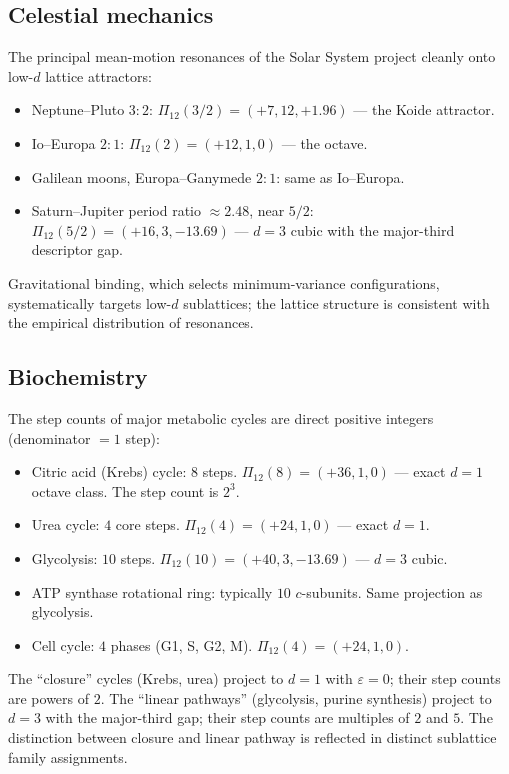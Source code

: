 \documentclass[11pt,a4paper]{article}
\theoremstyle{definition}
\theoremstyle{remark}
\newcommand{\eps}{\varepsilon}
\begin{document}
\subsection{Celestial mechanics}\label{subsec:celestial}

The principal mean-motion resonances of the Solar System project cleanly onto low-$d$ lattice attractors:
\begin{itemize}[leftmargin=*]
\item Neptune--Pluto $3{:}2$: $\Pi_{12}(3/2) = (+7, 12, +1.96)$ --- the Koide attractor.
\item Io--Europa $2{:}1$: $\Pi_{12}(2) = (+12, 1, 0)$ --- the octave.
\item Galilean moons, Europa--Ganymede $2{:}1$: same as Io--Europa.
\item Saturn--Jupiter period ratio $\approx 2.48$, near $5/2$: $\Pi_{12}(5/2) = (+16, 3, -13.69)$ --- $d=3$ cubic with the major-third descriptor gap.
\end{itemize}

Gravitational binding, which selects minimum-variance configurations, systematically targets low-$d$ sublattices; the lattice structure is consistent with the empirical distribution of resonances.

\subsection{Biochemistry}\label{subsec:biology}

The step counts of major metabolic cycles are direct positive integers (denominator $=1$ step):
\begin{itemize}[leftmargin=*]
\item Citric acid (Krebs) cycle: $8$ steps. $\Pi_{12}(8) = (+36, 1, 0)$ --- exact $d=1$ octave class. The step count is $2^{3}$.
\item Urea cycle: $4$ core steps. $\Pi_{12}(4) = (+24, 1, 0)$ --- exact $d=1$.
\item Glycolysis: $10$ steps. $\Pi_{12}(10) = (+40, 3, -13.69)$ --- $d=3$ cubic.
\item ATP synthase rotational ring: typically $10$ $c$-subunits. Same projection as glycolysis.
\item Cell cycle: $4$ phases (G1, S, G2, M). $\Pi_{12}(4) = (+24, 1, 0)$.
\end{itemize}

The ``closure'' cycles (Krebs, urea) project to $d=1$ with $\eps=0$; their step counts are powers of $2$. The ``linear pathways'' (glycolysis, purine synthesis) project to $d=3$ with the major-third gap; their step counts are multiples of $2$ and $5$. The distinction between closure and linear pathway is reflected in distinct sublattice family assignments.
\end{document}
